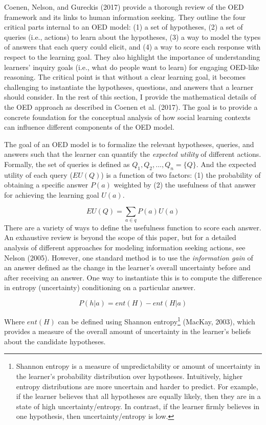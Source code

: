 \documentclass[english,floatsintext,man]{apa6}
\theoremstyle{definition}
\theoremstyle{definition}
\theoremstyle{definition}
\theoremstyle{remark}
\begin{document}
Coenen, Nelson, and Gureckis (2017) provide a thorough review of the OED
framework and its links to human information seeking. They outline the
four critical parts internal to an OED model: (1) a set of hypotheses,
(2) a set of queries (i.e., actions) to learn about the hypotheses, (3)
a way to model the types of answers that each query could elicit, and
(4) a way to score each response with respect to the learning goal. They
also highlight the importance of understanding learners' inquiry goals
(i.e., what do people want to learn) for engaging OED-like reasoning.
The critical point is that without a clear learning goal, it becomes
challenging to instantiate the hypotheses, questions, and answers that a
learner should consider. In the rest of this section, I provide the
mathematical details of the OED approach as described in Coenen et al.
(2017). The goal is to provide a concrete foundation for the conceptual
analysis of how social learning contexts can influence different
components of the OED model.

The goal of an OED model is to formalize the relevant hypotheses,
queries, and answers such that the learner can quantify the
\emph{expected utility} of different actions. Formally, the set of
queries is defined as \(Q_1, Q_2,..., Q_n = \{Q\}\). And the expected
utility of each query (\(EU(Q)\)) is a function of two factors: (1) the
probability of obtaining a specific answer \(P(a)\) weighted by (2) the
usefulness of that answer for achieving the learning goal \(U(a)\).

\[EU(Q) = \sum_{a\in q}{P(a)U(a)}\] \noindent
There are a variety of ways to define the usefulness function to score
each answer. An exhaustive review is beyond the scope of this paper, but
for a detailed analysis of different approaches for modeling information
seeking actions, see Nelson (2005). However, one standard method is to
use the \emph{information gain} of an answer defined as the change in
the learner's overall uncertainty before and after receiving an answer.
One way to instantiate this is to compute the difference in entropy
(uncertainty) conditioning on a particular answer.

\[P(h|a) = ent(H) - ent(H|a)\]

\noindent
Where \(ent(H)\) can be defined using Shannon entropy\footnote{Shannon
  entropy is a measure of unpredictability or amount of uncertainty in
  the learner's probability distribution over hypotheses. Intuitively,
  higher entropy distributions are more uncertain and harder to predict.
  For example, if the learner believes that all hypotheses are equally
  likely, then they are in a state of high uncertainty/entropy. In
  contrast, if the learner firmly believes in one hypothesis, then
  uncertainty/entropy is low.} (MacKay, 2003), which provides a measure
of the overall amount of uncertainty in the learner's beliefs about the
candidate hypotheses.
\end{document}
